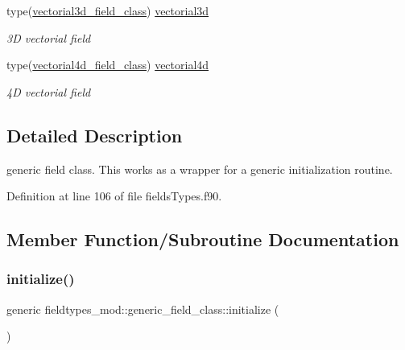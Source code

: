 \begin{DoxyCompactItemize}
type(\mbox{\hyperlink{structfieldtypes__mod_1_1vectorial3d__field__class}{vectorial3d\+\_\+field\+\_\+class}}) \mbox{\hyperlink{structfieldtypes__mod_1_1generic__field__class_aff0ebfb0a2e374714172bd0e7202f036}{vectorial3d}}
\begin{DoxyCompactList}\small\item\em 3D vectorial field \end{DoxyCompactList}\item 
type(\mbox{\hyperlink{structfieldtypes__mod_1_1vectorial4d__field__class}{vectorial4d\+\_\+field\+\_\+class}}) \mbox{\hyperlink{structfieldtypes__mod_1_1generic__field__class_a9a4f0f601cf52de94dcbbaa0a48bcf95}{vectorial4d}}
\begin{DoxyCompactList}\small\item\em 4D vectorial field \end{DoxyCompactList}\end{DoxyCompactItemize}


\subsection{Detailed Description}
generic field class. This works as a wrapper for a generic initialization routine. 

Definition at line 106 of file fields\+Types.\+f90.



\subsection{Member Function/\+Subroutine Documentation}
\mbox{\label{structfieldtypes__mod_1_1generic__field__class_a0fa61024cf22776788544cf848d767d7}} 
\subsubsection{\texorpdfstring{initialize()}{initialize()}}
{\footnotesize\ttfamily generic fieldtypes\+\_\+mod\+::generic\+\_\+field\+\_\+class\+::initialize (\begin{DoxyParamCaption}{ }\end{DoxyParamCaption})\hspace{0.3cm}{\ttfamily [private]}}



